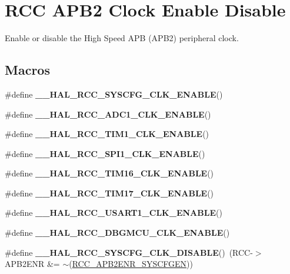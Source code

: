 \hypertarget{group___r_c_c___a_p_b2___clock___enable___disable}{}\section{R\+CC A\+P\+B2 Clock Enable Disable}
\label{group___r_c_c___a_p_b2___clock___enable___disable}


Enable or disable the High Speed A\+PB (A\+P\+B2) peripheral clock.  


\subsection*{Macros}
\begin{DoxyCompactItemize}
\item 
\#define {\bfseries \+\_\+\+\_\+\+H\+A\+L\+\_\+\+R\+C\+C\+\_\+\+S\+Y\+S\+C\+F\+G\+\_\+\+C\+L\+K\+\_\+\+E\+N\+A\+B\+LE}()
\item 
\#define {\bfseries \+\_\+\+\_\+\+H\+A\+L\+\_\+\+R\+C\+C\+\_\+\+A\+D\+C1\+\_\+\+C\+L\+K\+\_\+\+E\+N\+A\+B\+LE}()
\item 
\#define {\bfseries \+\_\+\+\_\+\+H\+A\+L\+\_\+\+R\+C\+C\+\_\+\+T\+I\+M1\+\_\+\+C\+L\+K\+\_\+\+E\+N\+A\+B\+LE}()
\item 
\#define {\bfseries \+\_\+\+\_\+\+H\+A\+L\+\_\+\+R\+C\+C\+\_\+\+S\+P\+I1\+\_\+\+C\+L\+K\+\_\+\+E\+N\+A\+B\+LE}()
\item 
\#define {\bfseries \+\_\+\+\_\+\+H\+A\+L\+\_\+\+R\+C\+C\+\_\+\+T\+I\+M16\+\_\+\+C\+L\+K\+\_\+\+E\+N\+A\+B\+LE}()
\item 
\#define {\bfseries \+\_\+\+\_\+\+H\+A\+L\+\_\+\+R\+C\+C\+\_\+\+T\+I\+M17\+\_\+\+C\+L\+K\+\_\+\+E\+N\+A\+B\+LE}()
\item 
\#define {\bfseries \+\_\+\+\_\+\+H\+A\+L\+\_\+\+R\+C\+C\+\_\+\+U\+S\+A\+R\+T1\+\_\+\+C\+L\+K\+\_\+\+E\+N\+A\+B\+LE}()
\item 
\#define {\bfseries \+\_\+\+\_\+\+H\+A\+L\+\_\+\+R\+C\+C\+\_\+\+D\+B\+G\+M\+C\+U\+\_\+\+C\+L\+K\+\_\+\+E\+N\+A\+B\+LE}()
\item 
\mbox{\label{group___r_c_c___a_p_b2___clock___enable___disable_gaf04a5f1f0d6d8577706022a866f4528e}} 
\#define {\bfseries \+\_\+\+\_\+\+H\+A\+L\+\_\+\+R\+C\+C\+\_\+\+S\+Y\+S\+C\+F\+G\+\_\+\+C\+L\+K\+\_\+\+D\+I\+S\+A\+B\+LE}()~(R\+CC-\/$>$A\+P\+B2\+E\+NR \&= $\sim$(\hyperlink{group___peripheral___registers___bits___definition_ga7a9d56a8aa1fa0f519ecbdf0d19dd4da}{R\+C\+C\+\_\+\+A\+P\+B2\+E\+N\+R\+\_\+\+S\+Y\+S\+C\+F\+G\+EN}))

\end{DoxyCompactItemize}
